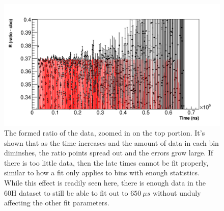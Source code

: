 	\begin{figure}[h]
		\centering
		\includegraphics[width=\textwidth]{ratio-latefitend}
	    \caption[RatioLateFitEndZoomed]{The formed ratio of the data, zoomed in on the top portion. It's shown that as the time increases and the amount of data in each bin diminshes, the ratio points spread out and the errors grow large. If there is too little data, then the late times cannot be fit properly, similar to how a \chisq fit only applies to bins with enough statistics. While this effect is readily seen here, there is enough data in the 60H dataset to still be able to fit out to $\SI{650}{\mu s}$ without unduly affecting the other fit parameters.}
	    \label{fig:RatioLateFitEndZoomed}
	\end{figure}

